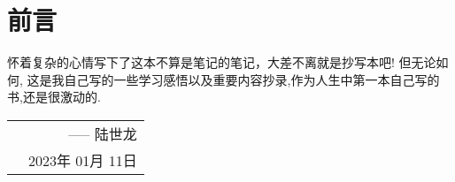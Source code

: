\thispagestyle{empty}
\chapter*{前言}
怀着复杂的心情写下了这本不算是笔记的笔记，大差不离就是抄写本吧! 但无论如何, 这是我自己写的一些学习感悟以及重要内容抄录,作为人生中第一本自己写的书,还是很激动的.


\hfill 
\begin{tabular}{lr}
    &----- 陆世龙\\ 
&2023年 01月 11日
\end{tabular}

\begin{center}
    \vfill
    \thepage
\end{center}
\let\cleardoublepage\clearpage